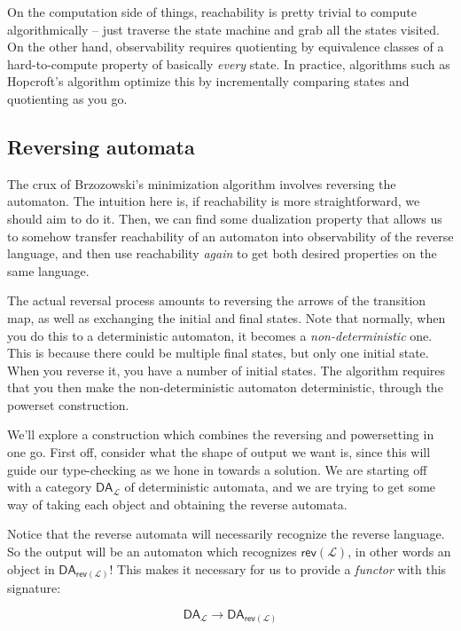 \documentclass{article}
\theoremstyle{plain}
\theoremstyle{definition}
\begin{document}
On the computation side of things, reachability is pretty trivial to compute algorithmically -- just traverse the state machine and grab all the states visited. On the other hand, observability requires quotienting by equivalence classes of a hard-to-compute property of basically \emph{every} state. In practice, algorithms such as Hopcroft's algorithm optimize this by incrementally comparing states and quotienting as you go.

\subsection{Reversing automata}


The crux of Brzozowski's minimization algorithm involves reversing the automaton. The intuition here is, if reachability is more straightforward, we should aim to do it. Then, we can find some dualization property that allows us to somehow transfer reachability of an automaton into observability of the reverse language, and then use reachability \emph{again} to get both desired properties on the same language.

The actual reversal process amounts to reversing the arrows of the transition map, as well as exchanging the initial and final states. Note that normally, when you do this to a deterministic automaton, it becomes a \emph{non-deterministic} one. This is because there could be multiple final states, but only one initial state. When you reverse it, you have a number of initial states. The algorithm requires that you then make the non-deterministic automaton deterministic, through the powerset construction.

We'll explore a construction which combines the reversing and powersetting in one go. First off, consider what the shape of output we want is, since this will guide our type-checking as we hone in towards a solution. We are starting off with a category \ensuremath{{\mathsf{DA}}_{\mathcal{L}}} of deterministic automata, and we are trying to get some way of taking each object and obtaining the reverse automata.

Notice that the reverse automata will necessarily recognize the reverse language. So the output will be an automaton which recognizes \ensuremath{\mathsf{rev}\left( \mathcal{L} \right)}, in other words an object in \ensuremath{{\mathsf{DA}}_{\mathsf{rev}\left( \mathcal{L} \right)}}! This makes it necessary for us to provide a \emph{functor} with this signature:

\[
{\mathsf{DA}}_{\mathcal{L}} \rightarrow {\mathsf{DA}}_{\mathsf{rev}\left( \mathcal{L} \right)}
\]
\end{document}
